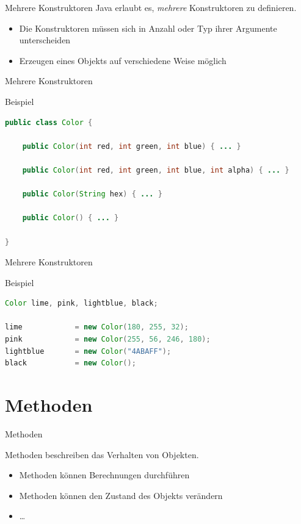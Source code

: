 \documentclass[18pt]{beamer}
\begin{document}
\begin{frame}{Mehrere Konstruktoren}
    Java erlaubt es, \textit{mehrere} Konstruktoren zu definieren.
    \begin{itemize}
        \item Die Konstruktoren müssen sich in Anzahl oder Typ ihrer Argumente unterscheiden
        \item Erzeugen eines Objekts auf verschiedene Weise möglich
    \end{itemize}
\end{frame}

\begin{frame}[fragile]{Mehrere Konstruktoren}
    \begin{exampleblock}{Beispiel}
        \begin{lstlisting}[language=Java,basicstyle=\scriptsize]
public class Color {

    public Color(int red, int green, int blue) { ... }

    public Color(int red, int green, int blue, int alpha) { ... }

    public Color(String hex) { ... }

    public Color() { ... }

}
        \end{lstlisting}

    \end{exampleblock}

\end{frame}

\begin{frame}[fragile]{Mehrere Konstruktoren}
    \begin{exampleblock}{Beispiel}
        \begin{lstlisting}[language=Java]
Color lime, pink, lightblue, black;

lime            = new Color(180, 255, 32);
pink            = new Color(255, 56, 246, 180);
lightblue       = new Color("4ABAFF");
black           = new Color();

        \end{lstlisting}

    \end{exampleblock}
\end{frame}


\section{Methoden}

\begin{frame}{Methoden}
    \begin{exampleblock}{}
        Methoden beschreiben das Verhalten von Objekten.
    \end{exampleblock}

    \begin{itemize}
        \item Methoden können Berechnungen durchführen
        \item Methoden können den Zustand des Objekts verändern
        \item \dots
    \end{itemize}

\end{frame}
\end{document}
